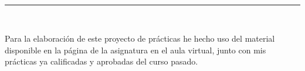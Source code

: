  \begin{center}
	{\fboxrule=4pt } \\
	\rule{15cm}{0pt} \\
\end{center}
\par Para la elaboración de este proyecto de prácticas he hecho uso del material disponible en la página de la asignatura en el aula virtual, junto con mis prácticas ya calificadas y aprobadas del curso pasado.


